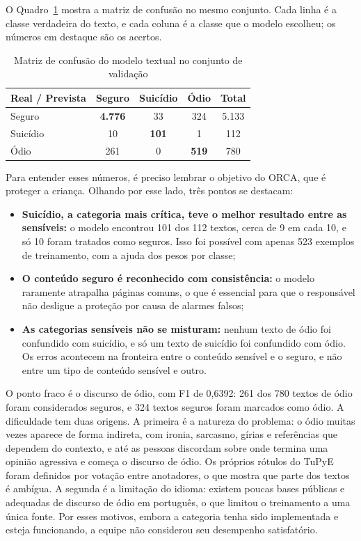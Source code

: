 \documentclass[
    12pt,           %
    oneside,        %
    a4paper,        %
    chapter=TITLE,  %
    english,        %
    brazil          %
]{abntex2}
\begin{document}
O Quadro~\ref{tab:confusao-texto} mostra a matriz de confusão no mesmo
conjunto. Cada linha é a classe verdadeira do texto, e cada coluna é a classe
que o modelo escolheu; os números em destaque são os acertos.
\begin{table}[htbp]
\centering
\small
\renewcommand{\arraystretch}{1.3}
\begin{tabular}{|l|c|c|c|c|}
\hline
\textbf{Real / Prevista} & \textbf{Seguro} & \textbf{Suicídio} & \textbf{Ódio} & \textbf{Total} \\ \hline
Seguro & \textbf{4.776} & 33 & 324 & 5.133 \\ \hline
Suicídio & 10 & \textbf{101} & 1 & 112 \\ \hline
Ódio & 261 & 0 & \textbf{519} & 780 \\ \hline
\end{tabular}
\caption{Matriz de confusão do modelo textual no conjunto de validação}
\label{tab:confusao-texto}
\end{table}

Para entender esses números, é preciso lembrar o objetivo do ORCA, que é
proteger a criança. Olhando por esse lado, três pontos se destacam:

\begin{itemize}
    \item \textbf{Suicídio, a categoria mais crítica, teve o melhor resultado
    entre as sensíveis:} o modelo encontrou 101 dos 112 textos, cerca de 9 em
    cada 10, e só 10 foram tratados como seguros. Isso foi possível com apenas
    523 exemplos de treinamento, com a ajuda dos pesos por classe;
    \item \textbf{O conteúdo seguro é reconhecido com consistência:} o modelo
    raramente atrapalha páginas comuns, o que é essencial para que o
    responsável não desligue a proteção por causa de alarmes falsos;
    \item \textbf{As categorias sensíveis não se misturam:} nenhum texto de
    ódio foi confundido com suicídio, e só um texto de suicídio foi
    confundido com ódio. Os erros acontecem na fronteira entre o conteúdo
    sensível e o seguro, e não entre um tipo de conteúdo sensível e outro.
\end{itemize}

O ponto fraco é o discurso de ódio, com F1 de 0,6392: 261 dos 780 textos de
ódio foram considerados seguros, e 324 textos seguros foram marcados como
ódio. A dificuldade tem duas origens. A primeira é a natureza do problema: o
ódio muitas vezes aparece de forma indireta, com ironia, sarcasmo, gírias e
referências que dependem do contexto, e até as pessoas discordam sobre onde
termina uma opinião agressiva e começa o discurso de ódio. Os próprios
rótulos do TuPyE foram definidos por votação entre anotadores, o que mostra
que parte dos textos é ambígua. A segunda é a limitação do idioma: existem
poucas bases públicas e adequadas de discurso de ódio em português, o que
limitou o treinamento a uma única fonte. Por esses motivos, embora a
categoria tenha sido implementada e esteja funcionando, a equipe não
considerou seu desempenho satisfatório.
\end{document}
